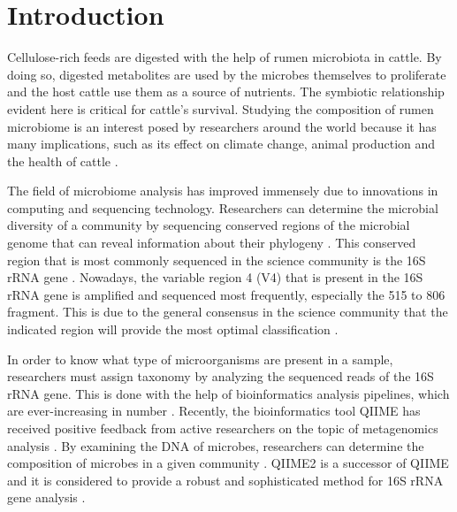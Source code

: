 \documentclass{singlecol-new}
\theoremstyle{TH}{
\newtheorem{lemma}{Lemma}
\newtheorem{theorem}[lemma]{Theorem}
\newtheorem{corrolary}[lemma]{Corrolary}
\newtheorem{conjecture}[lemma]{Conjecture}
\newtheorem{proposition}[lemma]{Proposition}
\newtheorem{claim}[lemma]{Claim}
\newtheorem{stheorem}[lemma]{Wrong Theorem}
\newtheorem{algorithm}{Algorithm}
}
\theoremstyle{THrm}{
\newtheorem{definition}{Definition}[section]
\newtheorem{question}{Question}[section]
\newtheorem{remark}{Remark}
\newtheorem{scheme}{Scheme}
}
\theoremstyle{THhit}{
\newtheorem{case}{Case}[section]
}
\begin{document}


\maketitle


 \section{Introduction}


Cellulose-rich feeds are digested with the help of rumen microbiota in cattle. By doing so, digested metabolites are used by the microbes themselves to proliferate and the host cattle use them as a source of nutrients. The symbiotic relationship evident here is critical for cattle's survival. Studying the composition of rumen microbiome is an interest posed by researchers around the world because it has many implications, such as its effect on climate change, animal production and the health of cattle \citep{mcgovern2018evaluating}.\linebreak

The field of microbiome analysis has improved immensely due to innovations in computing and sequencing technology. Researchers can determine the microbial diversity of a community by sequencing conserved regions of the microbial genome that can reveal information about their phylogeny \citep{de2017novel}. This conserved region that is most commonly sequenced in the science community is the 16S rRNA gene \citep{de2017novel, janda200716s}. Nowadays, the variable region 4 (V4) that is present in the 16S rRNA gene is amplified and sequenced most frequently, especially the 515 to 806 fragment. This is due to the general consensus in the science community that the indicated region will provide the most optimal classification \citep{de2017novel}.\linebreak

In order to know what type of microorganisms are present in a sample, researchers must assign taxonomy by analyzing the sequenced reads of the 16S rRNA gene. This is done with the help of bioinformatics analysis pipelines, which are ever-increasing in number \citep{siegwald2017assessment}. Recently, the bioinformatics tool QIIME has received positive feedback from active researchers on the topic of metagenomics analysis \citep{caporaso10}. By examining the DNA of microbes, researchers can determine the composition of microbes in a given community \citep{kuczynski2011using}.  QIIME2 is a successor of QIIME and it is considered to provide a robust and sophisticated method for 16S rRNA gene analysis \citep{hall2018, qiime2}.\linebreak
\end{document}
